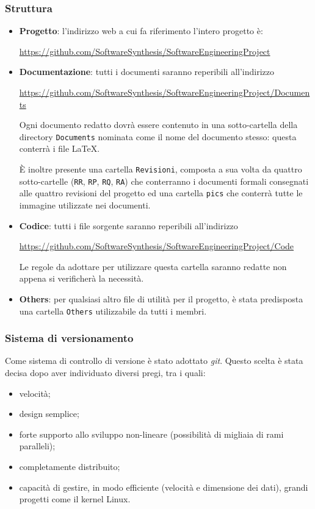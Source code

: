 \subsubsection{Struttura}
\label{sec:struttura}
\begin{itemize}
\item \textbf{Progetto}: l'indirizzo web a cui fa riferimento l'intero progetto è: 
\begin{center}
\url{https://github.com/SoftwareSynthesis/SoftwareEngineeringProject}
\end{center} 
\item \textbf{Documentazione}: tutti i documenti saranno reperibili all'indirizzo
\begin{center}
\url{https://github.com/SoftwareSynthesis/SoftwareEngineeringProject/Documents}
\end{center}
Ogni documento redatto dovrà essere contenuto in una sotto-cartella della directory \verb+Documents+ nominata come il nome del documento stesso: questa conterrà i file \LaTeX.

È inoltre presente una cartella \verb+Revisioni+, composta a sua volta da quattro sotto-cartelle (\verb+RR+, \verb+RP+, \verb+RQ+, \verb+RA+) che conterranno i documenti formali consegnati alle quattro revisioni del progetto ed una cartella \verb+pics+ che conterrà tutte le immagine utilizzate nei documenti.
\item \textbf{Codice}: tutti i file sorgente saranno reperibili all'indirizzo
\begin{center}
\url{https://github.com/SoftwareSynthesis/SoftwareEngineeringProject/Code}
\end{center}
Le regole da adottare per utilizzare questa cartella saranno redatte non appena si verificherà la necessità.
\item \textbf{Others}: per qualsiasi altro file di utilità per il progetto, è stata predisposta una cartella \verb+Others+ utilizzabile da tutti i membri.
\end{itemize}

\subsubsection{Sistema di versionamento}
Come sistema di controllo di versione  è stato adottato \textit{git}. Questo scelta è stata decisa dopo aver individuato diversi pregi, tra i quali:
\begin{itemize}
\item velocità;
\item design semplice;
\item forte supporto allo sviluppo non-lineare (possibilità di migliaia di rami paralleli);
\item completamente distribuito;
\item capacità di gestire, in modo efficiente (velocità e dimensione dei dati), grandi progetti come il kernel Linux.
\end{itemize}

